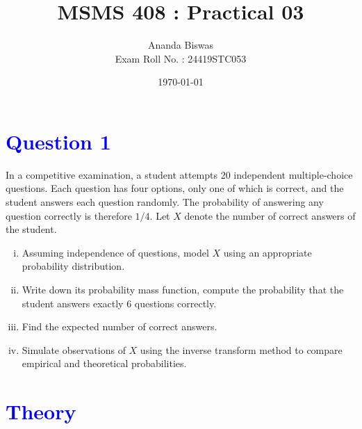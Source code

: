 \documentclass[11pt, a4paper]{article}\usepackage[]{graphicx}\usepackage[]{xcolor}
\title{MSMS 408 : Practical 03}
\author{Ananda Biswas \\[1em] Exam Roll No. : 24419STC053}
\date{\today}
\begin{document}
\maketitle


\section*{\faArrowAltCircleRight[regular] \textcolor{blue}{Question 1}}

\hspace{1cm} In a competitive examination, a student attempts 20 independent multiple-choice questions. Each question has four options, only one of which is correct, and the student answers each question randomly. The probability of answering any question correctly is therefore $1/4$. Let $X$ denote the number of correct answers of the student. 
\begin{enumerate}[(i)]
\item Assuming independence of questions, model $X$ using an appropriate probability distribution. 
\item Write down its probability mass function, compute the probability that the student answers exactly $6$ questions correctly.
\item Find the expected number of correct answers.
\item Simulate observations of $X$ using the inverse transform method to compare empirical and theoretical probabilities.
\end{enumerate}

\section*{\faArrowAltCircleRight[regular] \textcolor{blue}{Theory}}
\end{document}
